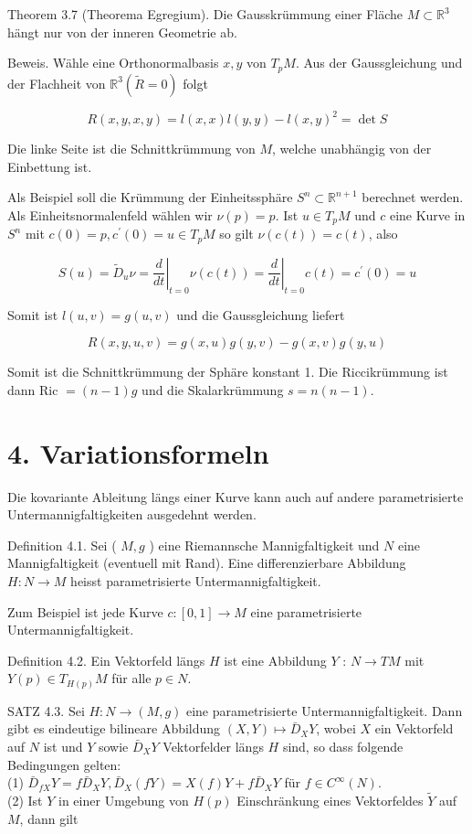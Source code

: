 \documentclass[10pt, letterpaper]{article}
\begin{document}
Theorem 3.7 (Theorema Egregium). Die Gausskrümmung einer Fläche $M \subset \mathbb{R}^{3}$ hängt nur von der inneren Geometrie ab.

Beweis. Wähle eine Orthonormalbasis $x, y$ von $T_{p} M$. Aus der Gaussgleichung und der Flachheit von $\mathbb{R}^{3}(\tilde{R}=0)$ folgt

$$
R(x, y, x, y)=l(x, x) l(y, y)-l(x, y)^{2}=\operatorname{det} S
$$

Die linke Seite ist die Schnittkrümmung von $M$, welche unabhängig von der Einbettung ist.

Als Beispiel soll die Krümmung der Einheitssphäre $S^{n} \subset \mathbb{R}^{n+1}$ berechnet werden. Als Einheitsnormalenfeld wählen wir $\nu(p)=p$. Ist $u \in T_{p} M$ und $c$ eine Kurve in $S^{n}$ mit $c(0)=p, c^{\prime}(0)=u \in T_{p} M$ so gilt $\nu(c(t))=c(t)$, also

$$
S(u)=\tilde{D}_{u} \nu=\left.\frac{d}{d t}\right|_{t=0} \nu(c(t))=\left.\frac{d}{d t}\right|_{t=0} c(t)=c^{\prime}(0)=u
$$

Somit ist $l(u, v)=g(u, v)$ und die Gaussgleichung liefert

$$
R(x, y, u, v)=g(x, u) g(y, v)-g(x, v) g(y, u)
$$

Somit ist die Schnittkrümmung der Sphäre konstant 1. Die Riccikrümmung ist dann Ric $=(n-1) g$ und die Skalarkrümmung $s=n(n-1)$.

\section*{4. Variationsformeln}
Die kovariante Ableitung längs einer Kurve kann auch auf andere parametrisierte Untermannigfaltigkeiten ausgedehnt werden.

Definition 4.1. Sei ( $M, g$ ) eine Riemannsche Mannigfaltigkeit und $N$ eine Mannigfaltigkeit (eventuell mit Rand). Eine differenzierbare Abbildung $H: N \rightarrow M$ heisst parametrisierte Untermannigfaltigkeit.

Zum Beispiel ist jede Kurve $c:[0,1] \rightarrow M$ eine parametrisierte Untermannigfaltigkeit.

Definition 4.2. Ein Vektorfeld längs $H$ ist eine Abbildung $Y$ : $N \rightarrow T M$ mit $Y(p) \in T_{H(p)} M$ für alle $p \in N$.

SATZ 4.3. Sei $H: N \rightarrow(M, g)$ eine parametrisierte Untermannigfaltigkeit. Dann gibt es eindeutige bilineare Abbildung $(X, Y) \mapsto \bar{D}_{X} Y$, wobei $X$ ein Vektorfeld auf $N$ ist und $Y$ sowie $\bar{D}_{X} Y$ Vektorfelder längs $H$ sind, so dass folgende Bedingungen gelten:\\
(1) $\bar{D}_{f X} Y=f \bar{D}_{X} Y, \bar{D}_{X}(f Y)=X(f) Y+f \bar{D}_{X} Y$ für $f \in C^{\infty}(N)$.\\
(2) Ist $Y$ in einer Umgebung von $H(p)$ Einschränkung eines Vektorfeldes $\tilde{Y}$ auf $M$, dann gilt
\end{document}
